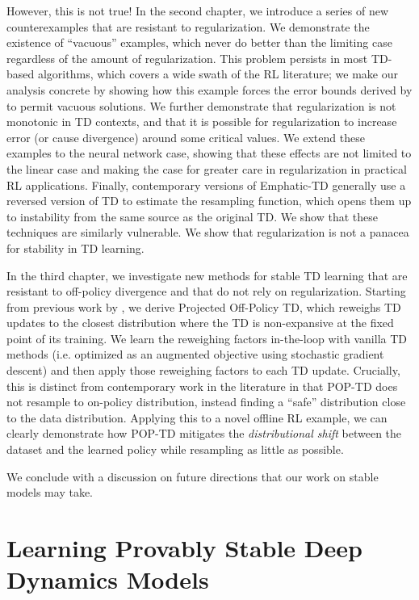 \documentclass[12pt]{cmuthesis}
\begin{document}
However, this is not true! In the second chapter, we introduce a series of new counterexamples that are resistant to regularization. We demonstrate the existence of ``vacuous'' examples, which never do better than the limiting case regardless of the amount of regularization. This problem persists in most TD-based algorithms, which covers a wide swath of the RL literature; we make our analysis concrete by showing how this example forces the error bounds derived by \citet{zhang2021breaking} to permit vacuous solutions. We further demonstrate that regularization is not monotonic in TD contexts, and that it is possible for regularization to increase error (or cause divergence) around some critical values. We extend these examples to the neural network case, showing that these effects are not limited to the linear case and making the case for greater care in regularization in practical RL applications. Finally, contemporary versions of Emphatic-TD generally use a reversed version of TD to estimate the resampling function, which opens them up to instability from the same source as the original TD. We show that these techniques are similarly vulnerable. We show that regularization is not a panacea for stability in TD learning.


In the third chapter, we investigate new methods for stable TD learning that are resistant to off-policy divergence and that do not rely on regularization. Starting from previous work by \citet{kolter2011fixed}, we derive Projected Off-Policy TD, which reweighs TD updates to the closest distribution where the TD is non-expansive at the fixed point of its training. We learn the reweighing factors in-the-loop with vanilla TD methods (i.e. optimized as an augmented objective using stochastic gradient descent) and then apply those reweighing factors to each TD update. Crucially, this is distinct from contemporary work in the literature in that POP-TD does not resample to on-policy distribution, instead finding a ``safe'' distribution close to the data distribution. Applying this to a novel offline RL example, we can clearly demonstrate how POP-TD mitigates the \emph{distributional shift} between the dataset and the learned policy \cite{levine2020survey} while resampling as little as possible.

We conclude with a discussion on future directions that our work on stable models may take.


\mainmatter
\chapter[Learning Stable Dynamics Models]{Learning Provably Stable Deep Dynamics Models}

\end{document}

